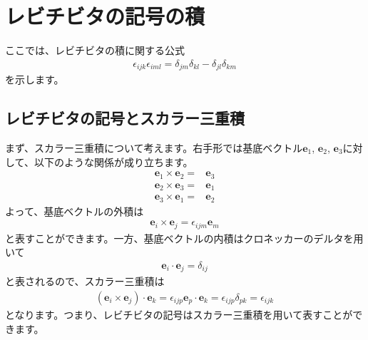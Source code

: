 \documentclass{ltjarticle}
\begin{document}
    \section{レビチビタの記号の積}\label{sec:levi_multiple}
    ここでは、レビチビタの積に関する公式
    \begin{align*}
        \epsilon_{ijk}\epsilon_{iml} = \delta_{jm}\delta_{kl} - \delta_{jl}\delta_{km}
    \end{align*}
    を示します。
    \subsection{レビチビタの記号とスカラー三重積}
    まず、スカラー三重積について考えます。右手形では基底ベクトル$\bm{e}_1$, $\bm{e}_2$, $\bm{e}_3$に対して、以下のような関係が成り立ちます。
    \begin{align*}
        \bm{e}_1\times\bm{e}_2 =& \bm{e}_3 \\
        \bm{e}_2\times\bm{e}_3 =& \bm{e}_1 \\
        \bm{e}_3\times\bm{e}_1 =& \bm{e}_2 
    \end{align*}
    よって、基底ベクトルの外積は
    \begin{align*}
        \bm{e}_i\times\bm{e}_j = \epsilon_{ijm}\bm{e}_m
    \end{align*}
    と表すことができます。一方、基底ベクトルの内積はクロネッカーのデルタを用いて
    \begin{align*}
        \bm{e}_i\cdot\bm{e}_j = \delta_{ij}
    \end{align*}
    と表されるので、スカラー三重積は
    \begin{align*}
        \left(
            \bm{e}_i\times\bm{e}_j    
        \right)
        \cdot \bm{e}_k
        = \epsilon_{ijp}\bm{e}_p\cdot \bm{e}_k
        = \epsilon_{ijp}\delta_{pk}
        = \epsilon_{ijk}
    \end{align*}
    となります。つまり、レビチビタの記号はスカラー三重積を用いて表すことができます。
\end{document}
